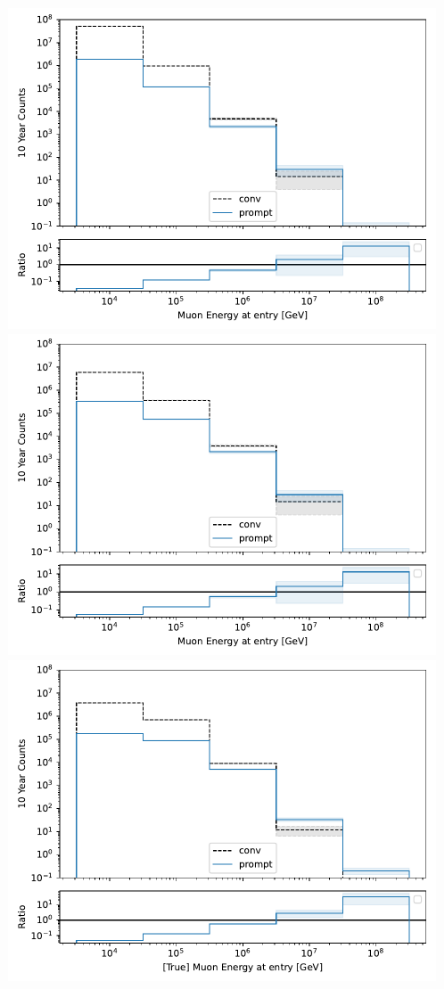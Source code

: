\documentclass[aspectratio=1610, 9pt]{beamer}
\begin{document}
\begin{frame}
\begin{minipage}[t]{0.24\textwidth}
  \end{minipage}
  \begin{minipage}[t]{0.24\textwidth}
    \includegraphics[width=0.85\textwidth]{../Plots/leading_spectrum_reco.pdf}
    \includegraphics[width=0.85\textwidth]{../Plots/leading_spectrum_reco_5e5surface.pdf}
    \includegraphics[width=0.85\textwidth]{../Plots/leading_spectrum_reco_5e5surface_quality.pdf}
  \end{minipage}
\end{frame}
\end{document}
